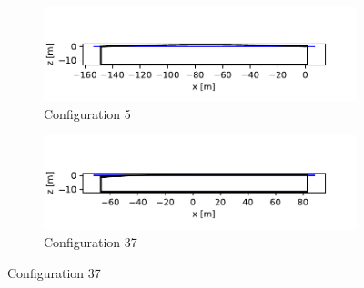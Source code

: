 \begin{figure}[h]
    \centering
    \begin{subfigure}[b]{0.49\textwidth}
        \centering
        \includegraphics[width=\linewidth]{figures/ComFLOW/Breakwater Geometries/Design Iteration 1 captive/general/breakwater_geometry5.pdf}
        \caption[]%
        {{\small Configuration 5}}    
        \label{}
    \end{subfigure}
    \hfill
    \begin{subfigure}[b]{0.49\textwidth}  
        \centering 
        \includegraphics[width=\linewidth]{figures/ComFLOW/Breakwater Geometries/Design Iteration 1 captive/general/breakwater_geometry37.pdf}
        \caption[]%
        {{\small Configuration 37}}    
        \label{}
    \end{subfigure}
    

\end{figure}
